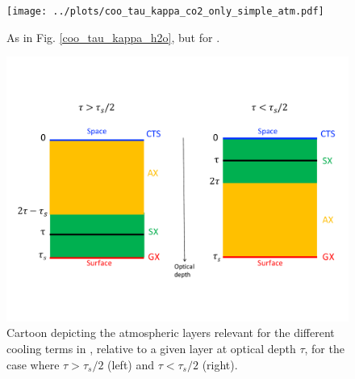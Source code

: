 \documentclass[10pt]{article}
\newcommand{\taus}{\ensuremath{\tau_s}}
\begin{document}
\begin{figure}[h]
	\begin{center}
			\texttt{[image: ../plots/coo\_tau\_kappa\_co2\_only\_simple\_atm.pdf]}
		\caption{As in Fig. \ref{coo_tau_kappa_h2o}, but for \cotwo.
		\label{coo_tau_kappa_co2}
		}
	\end{center}
\end{figure}

\begin{figure}[h!]
	\begin{center}
			\includegraphics[scale=0.6]{../plots/cts_decomp_cartoon.pdf}
		\caption{Cartoon depicting the atmospheric layers relevant for the different cooling terms in , relative to a given layer at optical depth $\tau$, for the case where $\tau > \taus/2$ (left) and $\tau<\taus/2$ (right).
		\label{cts_decomp_cartoon}
		}
	\end{center}
\end{figure}
\end{document}
